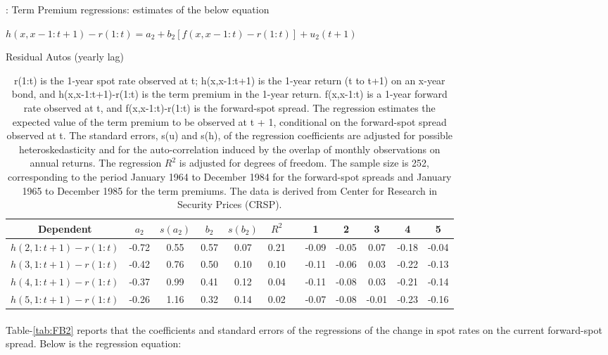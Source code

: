 \documentclass[11pt]{article}
\begin{document}
\begin{table}[H]
\centering
\caption{: Term Premium regressions: estimates of the below equation} \label{tab:FB1}
\caption*{$h(x,x-1:t+1)-r(1:t)=a_{2}+b_{2}[f(x,x-1:t)-r(1:t)]+u_{2}(t+1)$}
\caption*{r(1:t) is the 1-year spot rate observed at t; h(x,x-1:t+1) is the 1-year return (t to t+1) on an x-year bond, and h(x,x-1:t+1)-r(1:t) is the term premium in the 1-year return. f(x,x-1:t) is a 1-year forward rate
observed at t, and f(x,x-1:t)-r(1:t) is the forward-spot spread. The regression estimates the expected value of the term premium to be observed at t + 1, conditional on the forward-spot spread observed at t. The standard errors, s(u) and s(h), of the regression coefficients are adjusted for possible heteroskedasticity and for the auto-correlation
induced by the overlap of monthly observations on annual returns. The regression $R^2$ is adjusted for degrees of freedom. The sample size is 252, corresponding to the period
January 1964 to December 1984 for the forward-spot spreads and January 1965 to December 1985 for the term
premiums. The data is derived from Center for Research in Security Prices (CRSP).}
\toprule
\hspace*{\fill} Residual Autos (yearly lag)
\begin{tabular}{cccccccccccc}
 \midrule
 Dependent & $a_{2}$ & $s(a_{2})$ & $b_{2}$ & $s(b_{2})$ & $R^{2}$ & & 1 & 2 & 3 & 4 & 5 \\
 \hline
 $h(2,1:t+1)-r(1:t)$ & -0.72 & 0.55 & 0.57 & 0.07 & 0.21 & &-0.09 & -0.05 & 0.07 & -0.18 & -0.04 \\ 
  $h(3,1:t+1)-r(1:t)$ & -0.42 & 0.76 & 0.50 & 0.10 & 0.10 & &-0.11 & -0.06 & 0.03 & -0.22 & -0.13 \\ 
  $h(4,1:t+1)-r(1:t)$ & -0.37 & 0.99 & 0.41 & 0.12 & 0.04 & &-0.11 & -0.08 & 0.03 & -0.21 & -0.14 \\ 
  $h(5,1:t+1)-r(1:t)$ & -0.26 & 1.16 & 0.32 & 0.14 & 0.02 & &-0.07 & -0.08 & -0.01 & -0.23 & -0.16 \\ 
  \bottomrule
\end{tabular}
\end{table}

\paragraph{} Table-\ref{tab:FB2} reports that the coefficients and standard errors of the regressions of the change in spot rates on the current forward-spot spread. Below is the regression equation:
\end{document}
